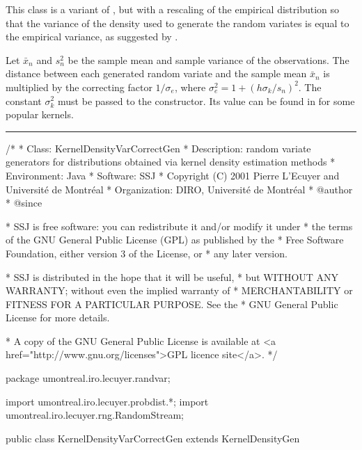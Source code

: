
This class is a variant of , but with
a rescaling of the empirical distribution so that the variance
of the density used to generate the random variates is equal
to the empirical variance,
 as suggested by .

Let $\bar x_n$ and $s_n^2$ be the sample mean and sample variance 
of the observations.
The distance between each generated random variate and the 
sample mean $\bar x_n$ is multiplied by the correcting factor
$1/\sigma_e$, where $\sigma_e^2 = 1 + (h\sigma_k/s_n)^2$.
The constant $\sigma_k^2$ must be passed to the constructor.
Its value can be found in 
 for some popular
kernels.


\bigskip\hrule

\begin{code}
\begin{hide}
/*
 * Class:        KernelDensityVarCorrectGen
 * Description:  random variate generators for distributions obtained via
                 kernel density estimation methods
 * Environment:  Java
 * Software:     SSJ 
 * Copyright (C) 2001  Pierre L'Ecuyer and Université de Montréal
 * Organization: DIRO, Université de Montréal
 * @author       
 * @since

 * SSJ is free software: you can redistribute it and/or modify it under
 * the terms of the GNU General Public License (GPL) as published by the
 * Free Software Foundation, either version 3 of the License, or
 * any later version.

 * SSJ is distributed in the hope that it will be useful,
 * but WITHOUT ANY WARRANTY; without even the implied warranty of
 * MERCHANTABILITY or FITNESS FOR A PARTICULAR PURPOSE.  See the
 * GNU General Public License for more details.

 * A copy of the GNU General Public License is available at
   <a href="http://www.gnu.org/licenses">GPL licence site</a>.
 */
\end{hide}
package umontreal.iro.lecuyer.randvar;\begin{hide}
import umontreal.iro.lecuyer.probdist.*;
import umontreal.iro.lecuyer.rng.RandomStream;\end{hide}

public class KernelDensityVarCorrectGen extends KernelDensityGen\begin{hide} {

   protected double sigmak2;   // Value of sigma_k^2.
   protected double mean;      // Sample mean of the observations.
   protected double invSigmae; // 1 / sigma_e.
\end{hide}
\end{code}
